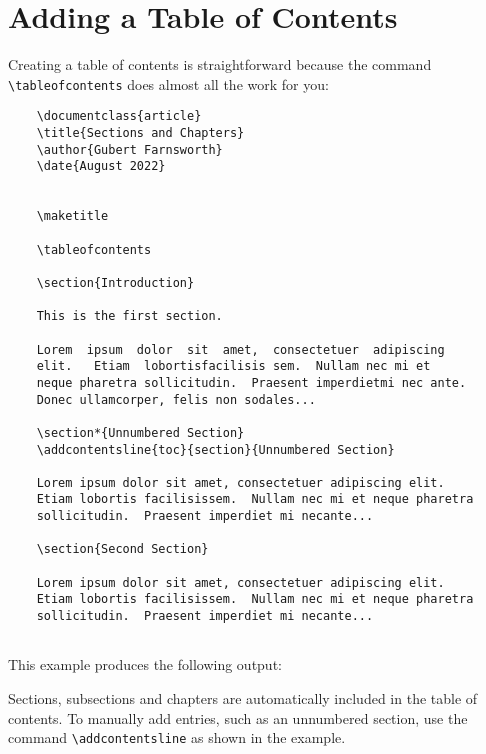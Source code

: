 \section{Adding a Table of Contents}

Creating a table of contents is straightforward because the command \verb|\tableofcontents| does almost all the work for you:

\begin{tcolorbox}
\begin{verbatim}
    \documentclass{article}
    \title{Sections and Chapters}
    \author{Gubert Farnsworth}
    \date{August 2022}
    
  
    \maketitle
  
    \tableofcontents

    \section{Introduction}
   
    This is the first section.
      
    Lorem  ipsum  dolor  sit  amet,  consectetuer  adipiscing  
    elit.   Etiam  lobortisfacilisis sem.  Nullam nec mi et 
    neque pharetra sollicitudin.  Praesent imperdietmi nec ante. 
    Donec ullamcorper, felis non sodales...
       
    \section*{Unnumbered Section}
    \addcontentsline{toc}{section}{Unnumbered Section}

    Lorem ipsum dolor sit amet, consectetuer adipiscing elit.  
    Etiam lobortis facilisissem.  Nullam nec mi et neque pharetra 
    sollicitudin.  Praesent imperdiet mi necante...

    \section{Second Section}
       
    Lorem ipsum dolor sit amet, consectetuer adipiscing elit.  
    Etiam lobortis facilisissem.  Nullam nec mi et neque pharetra 
    sollicitudin.  Praesent imperdiet mi necante...
    
\end{verbatim}
\end{tcolorbox}

This example produces the following output:


Sections, subsections and chapters are automatically included in the table of contents. To manually add entries, such as an unnumbered section, use the command \verb|\addcontentsline| as shown in the example.